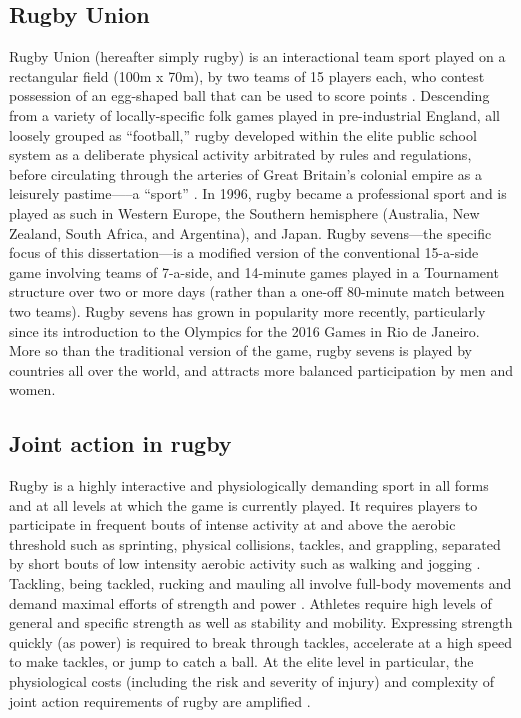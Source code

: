 \begin{CJK}{UTF8}{gbsn}
\section{Rugby Union\label{sect:rugbyUnion}}
Rugby Union (hereafter simply rugby) is an interactional team sport played on a rectangular field (100m x 70m), by two teams of 15 players each, who contest possession of an egg-shaped ball that can be used to score points \citep{IRB2014}.  Descending from a variety of locally-specific folk games played in pre-industrial England, all loosely grouped as ``football,'' rugby developed within the elite public school system as a deliberate physical activity arbitrated by rules and regulations, before circulating through the arteries of Great Britain's colonial empire as a leisurely pastime—--a ``sport'' \citep{Dunning2005}.  In 1996, rugby became a professional sport and is played as such in Western Europe, the Southern hemisphere (Australia, New Zealand, South Africa, and Argentina), and Japan. Rugby sevens---the specific focus of this dissertation---is a modified version of the conventional 15-a-side game involving teams of 7-a-side, and 14-minute games played in a Tournament structure over two or more days (rather than a one-off 80-minute match between two teams).  Rugby sevens has grown in popularity more recently, particularly since its introduction to the Olympics for the 2016 Games in Rio de Janeiro.  More so than the traditional version of the game, rugby sevens is played by countries all over the world, and attracts more balanced participation by men and women.

\subsection{Joint action in rugby \label{sect:jointActionRugby}}
Rugby is a highly interactive and physiologically demanding sport in all forms and at all levels at which the game is currently played.  It requires players to participate in frequent bouts of intense activity at and above the aerobic threshold such as sprinting, physical collisions, tackles, and grappling, separated by short bouts of low intensity aerobic activity such as walking and jogging \cite{Duthie2003}.  Tackling, being tackled, rucking and mauling all involve full-body movements and demand maximal efforts of strength and power \citep{Elloumi2012}.  Athletes require high levels of general and specific strength as well as stability and mobility.  Expressing strength quickly (as power) is required to break through tackles, accelerate at a high speed to make tackles, or jump to catch a ball.  At the elite level in particular, the physiological costs (including the risk and severity of injury) and complexity of joint action requirements of rugby are amplified \citep{Coughlan2011}.


\end{CJK}
